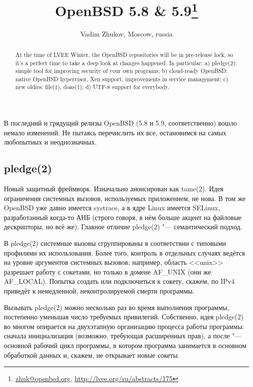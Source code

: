 \documentclass[10pt, a5paper]{article}
\begin{document}
\title{OpenBSD 5.8 \& 5.9\footnote{\url{zhuk@openbsd.org}, \url{http://lvee.org/ru/abstracts/175}}}
\author{Vadim Zhukov, Moscow, russia}
\maketitle
\begin{abstract}
At the time of LVEE Winter, the OpenBSD repositories will be in pre-release lock, so it's a perfect time to take a deep look at changes happened. In particular: a) pledge(2): simple tool for improving security of your own programs; b) cloud-ready OpenBSD: native OpenBSD hypervisor, Xen support, improvements in service management; c) new oldies: file(1), doas(1); d) UTF-8 support for everybody.
\end{abstract}

В последний и грядущий релизы OpenBSD (5.8 и 5.9, соответственно) вошло немало изменений. Не пытаясь перечислить их все, остановимся на самых любопытных и неоднозначных.

\subsection*{pledge(2)}

Новый защитный фреймворк. Изначально анонсирован как \linebreak tame(2). Идея ограничения системных вызовов, используемых приложением, не нова. В том же OpenBSD уже давно имеется systrace, а в ядре Linux имеется SELinux, разработанный когда-то АНБ (строго говоря, в нём больше акцент на файловые дескрипторы, но всё же). Главное отличие pledge(2) "--- семантический подход.

В pledge(2) системные вызовы сгруппированы в соответствии с типовыми профилями их использования. Более того, контроль в отдельных случаях ведётся на уровне аргументов системных вызовов: например, область <<unix>> разрешает работу с сокетами, но только в домене AF\_UNIX (они же AF\_LOCAL). Попытка создать или подключиться к сокету, скажем, по IPv4 приведёт к немедленной, неконтролируемой смерти программы.

Вызывать pledge(2) можно несколько раз во время выполнения программы, постепенно уменьшая число требуемых привилегий. Собственно, идея pledge(2) во многом опирается на двухэтапную организацию процесса работы программы: сначала инициализация (возможно, требующая расширенных прав), а после "--- основной рабочий цикл программы, в котором программа занимается в основном обработкой данных и, скажем, не открывает новые сокеты.
\end{document}

